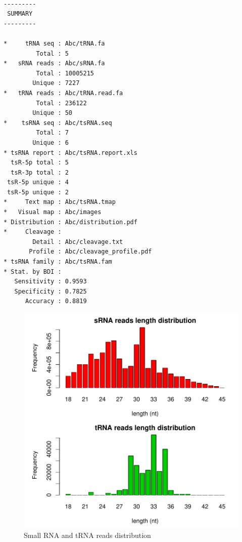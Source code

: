 \documentclass[11pt, a4paper]{article}
\begin{document}
{\footnotesize \begin{tcolorbox}[colback=blue!5!white,colframe=blue!75!black,title=tsRFinder demo output list]
\begin{verbatim}

---------
 SUMMARY 
---------

*     tRNA seq : Abc/tRNA.fa
         Total : 5
*   sRNA reads : Abc/sRNA.fa
         Total : 10005215
        Unique : 7227
*   tRNA reads : Abc/tRNA.read.fa
         Total : 236122
        Unique : 50
*    tsRNA seq : Abc/tsRNA.seq
         Total : 7
        Unique : 6
* tsRNA report : Abc/tsRNA.report.xls
  tsR-5p total : 5
  tsR-3p total : 2
 tsR-5p unique : 4
 tsR-5p unique : 2
*     Text map : Abc/tsRNA.tmap
*   Visual map : Abc/images
* Distribution : Abc/distribution.pdf
*     Cleavage :
        Detail : Abc/cleavage.txt
       Profile : Abc/cleavage_profile.pdf
* tsRNA family : Abc/tsRNA.fam
* Stat. by BDI :
   Sensitivity : 0.9593
   Specificity : 0.7825
      Accuracy : 0.8819

\end{verbatim}
\end{tcolorbox}}

\begin{figure}[htbp]
\begin{center}
\includegraphics[width=13cm]{distribution.pdf}
\caption{Small RNA and tRNA reads distribution}
\label{distribution}
\end{center}
\end{figure}
\end{document}
